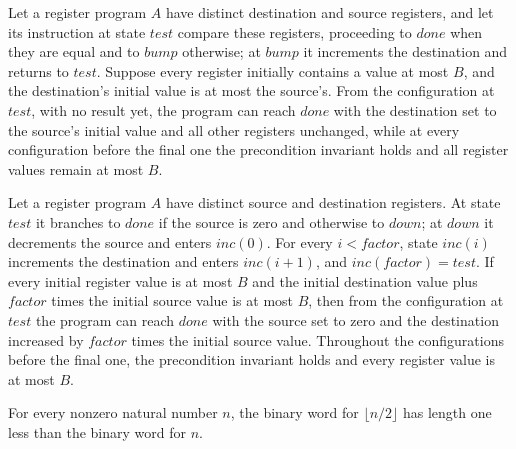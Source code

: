 \begin{theorem}
\label{Complexity.LogProg.registerCopy_loop}
\leanok
{}
Let a register program $A$ have distinct destination and source registers, and let its
instruction at state $test$ compare these registers, proceeding to $done$ when they are
equal and to $bump$ otherwise; at $bump$ it increments the destination and returns to
$test$. Suppose every register initially contains a value at most $B$, and the
destination's initial value is at most the source's. From the configuration at $test$,
with no result yet, the program can reach $done$ with the destination set to the
source's initial value and all other registers unchanged, while at every configuration
before the final one the precondition invariant holds and all register values remain at
most $B$.
\end{theorem}

\begin{theorem}
\label{Complexity.LogProg.registerScale_loop}
\leanok
{}
Let a register program $A$ have distinct source and destination registers. At state
$test$ it branches to $done$ if the source is zero and otherwise to $down$; at $down$ it
decrements the source and enters $inc(0)$. For every $i<factor$, state $inc(i)$
increments the destination and enters $inc(i+1)$, and $inc(factor)=test$. If every
initial register value is at most $B$ and the initial destination value plus $factor$
times the initial source value is at most $B$, then from the configuration at $test$ the
program can reach $done$ with the source set to zero and the destination increased by
$factor$ times the initial source value. Throughout the configurations before the final
one, the precondition invariant holds and every register value is at most $B$.
\end{theorem}

\begin{lemma}
\label{Complexity.LogProg.access_width_half}
\leanok
{}
For every nonzero natural number $n$, the binary word for $\lfloor n/2\rfloor$ has
length one less than the binary word for $n$.
\end{lemma}

